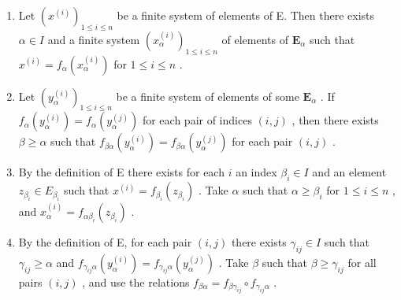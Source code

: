\begin{enumerate}
\def\labelenumi{(\roman{enumi})}
\item
  Let \((x^{(i)})_{1\leqslant i\leqslant n}\) be a finite system of elements of E. Then there exists \(\alpha \in I\) and a finite system \((x_{\alpha}^{(i)})_{1\leqslant i\leqslant n}\) of elements of \(\mathbf{E}_{\alpha}\) such that \(x^{(i)} = f_{\alpha}(x_{\alpha}^{(i)})\) for \(1\leqslant i\leqslant n\) .
\item
  Let \((y_{\alpha}^{(i)})_{1\leqslant i\leqslant n}\) be a finite system of elements of some \(\mathbf{E}_{\alpha}\) . If \(f_{\alpha}(y_{\alpha}^{(i)}) = f_{\alpha}(y_{\alpha}^{(j)})\) for each pair of indices \((i,j)\) , then there exists \(\beta \geqslant \alpha\) such that \(f_{\beta \alpha}(y_{\alpha}^{(i)}) = f_{\beta \alpha}(y_{\alpha}^{(j)})\) for each pair \((i,j)\) .
\item
  By the definition of E there exists for each \(i\) an index \(\beta_{i} \in I\) and an element \(z_{\beta_{i}} \in E_{\beta_{i}}\) such that \(x^{(i)} = f_{\beta_{i}}(z_{\beta_{i}})\) . Take \(\alpha\) such that \(\alpha \geqslant \beta_{i}\) for \(1 \leqslant i \leqslant n\) , and \(x_{\alpha}^{(i)} = f_{\alpha \beta_{i}}(z_{\beta_{i}})\) .
\item
  By the definition of E, for each pair \((i, j)\) there exists \(\gamma_{ij} \in I\) such that \(\gamma_{ij} \geqslant \alpha\) and \(f_{\gamma_{ij}\alpha}(y_{\alpha}^{(i)}) = f_{\gamma_{ij}\alpha}(y_{\alpha}^{(j)})\) . Take \(\beta\) such that \(\beta \geqslant \gamma_{ij}\) for all pairs \((i, j)\) , and use the relations \(f_{\beta\alpha} = f_{\beta\gamma_{ij}} \circ f_{\gamma_{ij}\alpha}\) .
\end{enumerate}

